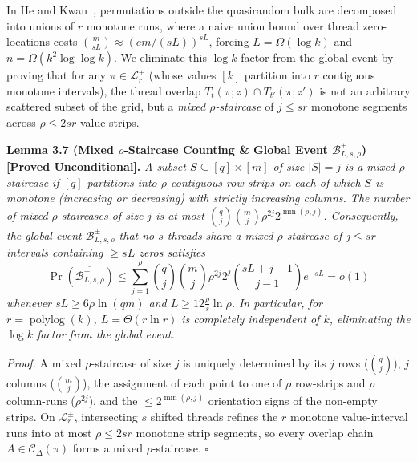 \documentclass[
  11pt,
]{article}
\begin{document}
In He and Kwan~\cite{ref-HK20}, permutations outside the quasirandom bulk are decomposed into unions of \(r\) monotone runs, where a naive union bound over thread zero-locations costs \(\binom{m}{sL} \approx (em/(sL))^{sL}\), forcing \(L = \Omega(\log k)\) and \(n = \Omega(k^2 \log\log k)\). We eliminate this \(\log k\) factor from the global event by proving that for any \(\pi \in \mathcal{L}^\pm_r\) (whose values \([k]\) partition into \(r\) contiguous monotone intervals), the thread overlap \(T_t(\pi; z) \cap T_{t'}(\pi; z')\) is not an arbitrary scattered subset of the grid, but a \emph{mixed \(\rho\)-staircase} of \(j \le s r\) monotone segments across \(\rho \le 2 s r\) value strips.

\textbf{Lemma 3.7 (Mixed \(\rho\)-Staircase Counting \& Global Event \(\mathcal{B}^\pm_{L, s, \rho}\)) [Proved Unconditional].}
\emph{A subset \(S \subseteq [q] \times [m]\) of size \(|S| = j\) is a \emph{mixed \(\rho\)-staircase} if \([q]\) partitions into \(\rho\) contiguous row strips on each of which \(S\) is monotone (increasing or decreasing) with strictly increasing columns. The number of mixed \(\rho\)-staircases of size \(j\) is at most \(\binom{q}{j} \binom{m}{j} \rho^{2j} 2^{\min(\rho, j)}\). Consequently, the global event \(\mathcal{B}^\pm_{L, s, \rho}\) that no \(s\) threads share a mixed \(\rho\)-staircase of \(j \le sr\) intervals containing \(\ge sL\) zeros satisfies}
\begin{equation}
\Pr\left(\overline{\mathcal{B}^\pm_{L, s, \rho}}\right) \le \sum_{j=1}^{\rho} \binom{q}{j} \binom{m}{j} \rho^{2j} 2^j \binom{sL + j - 1}{j - 1} e^{-sL} = o(1)
\end{equation}
\emph{whenever \(sL \ge 6 \rho \ln(qm)\) and \(L \ge 12 \frac{\rho}{s} \ln \rho\). In particular, for \(r = \operatorname{polylog}(k)\), \(L = \Theta(r \ln r)\) is completely independent of \(k\), eliminating the \(\log k\) factor from the global event.}

\emph{Proof.} A mixed \(\rho\)-staircase of size \(j\) is uniquely determined by its \(j\) rows (\(\binom{q}{j}\)), \(j\) columns (\(\binom{m}{j}\)), the assignment of each point to one of \(\rho\) row-strips and \(\rho\) column-runs (\(\rho^{2j}\)), and the \(\le 2^{\min(\rho, j)}\) orientation signs of the non-empty strips. On \(\mathcal{L}^\pm_r\), intersecting \(s\) shifted threads refines the \(r\) monotone value-interval runs into at most \(\rho \le 2sr\) monotone strip segments, so every overlap chain \(A \in \mathcal{C}_\Delta(\pi)\) forms a mixed \(\rho\)-staircase. \(\square\)
\end{document}
